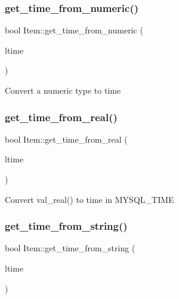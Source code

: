 \subsubsection{\texorpdfstring{get\+\_\+time\+\_\+from\+\_\+numeric()}{get\_time\_from\_numeric()}}
{\footnotesize\ttfamily bool Item\+::get\+\_\+time\+\_\+from\+\_\+numeric (\begin{DoxyParamCaption}\item[{M\+Y\+S\+Q\+L\+\_\+\+T\+I\+ME $\ast$}]{ltime }\end{DoxyParamCaption})\hspace{0.3cm}{\ttfamily [protected]}}

Convert a numeric type to time \mbox{\label{classItem_a309d78890d1ca16e7555d3030614a9fa}} 
\subsubsection{\texorpdfstring{get\+\_\+time\+\_\+from\+\_\+real()}{get\_time\_from\_real()}}
{\footnotesize\ttfamily bool Item\+::get\+\_\+time\+\_\+from\+\_\+real (\begin{DoxyParamCaption}\item[{M\+Y\+S\+Q\+L\+\_\+\+T\+I\+ME $\ast$}]{ltime }\end{DoxyParamCaption})\hspace{0.3cm}{\ttfamily [protected]}}

Convert val\+\_\+real() to time in M\+Y\+S\+Q\+L\+\_\+\+T\+I\+ME \mbox{\label{classItem_a1f6773c162fa458b6ef2087b427244b7}} 
\subsubsection{\texorpdfstring{get\+\_\+time\+\_\+from\+\_\+string()}{get\_time\_from\_string()}}
{\footnotesize\ttfamily bool Item\+::get\+\_\+time\+\_\+from\+\_\+string (\begin{DoxyParamCaption}\item[{M\+Y\+S\+Q\+L\+\_\+\+T\+I\+ME $\ast$}]{ltime }\end{DoxyParamCaption})\hspace{0.3cm}{\ttfamily [protected]}}

